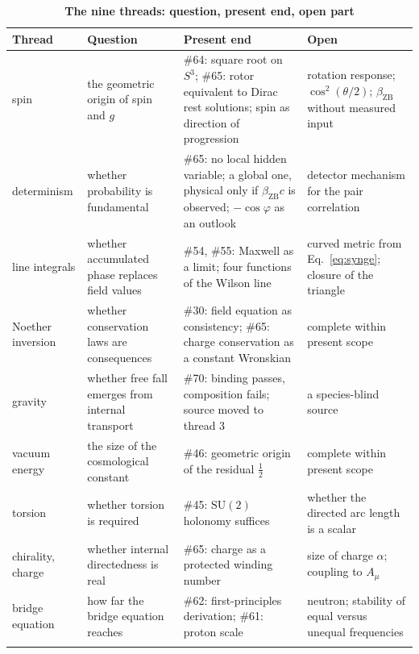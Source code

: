 \documentclass[%
 reprint, amsmath,amssymb, aps, prb, ]{revtex4-2}
\numberwithin{equation}{section}
\newcommand{\betaZB}{\beta_{\text{ZB}}}
\begin{document}
\begin{table}[t!]
\centering
\caption{\textbf{The nine threads: question, present end, open part}}
\label{tab:threads}
\renewcommand{\arraystretch}{1.35}
\setlength{\tabcolsep}{6pt}
\begin{tabular}{>{\raggedright\arraybackslash}p{2.4cm}>{\raggedright\arraybackslash}p{4.0cm}>{\raggedright\arraybackslash}p{5.0cm}>{\raggedright\arraybackslash}p{4.8cm}}
\toprule
\textbf{Thread} & \textbf{Question} & \textbf{Present end} & \textbf{Open} \\
\midrule
1 spin & the geometric origin of spin and $g$ & \#64: square root on $S^{3}$; \#65: rotor equivalent to Dirac rest solutions; spin as direction of progression & rotation response; $\cos^{2}(\theta/2)$; $\betaZB$ without measured input \\
\addlinespace[0.1cm]
2 determinism & whether probability is fundamental & \#65: no local hidden variable; a global one, physical only if $\betaZB c$ is observed; $-\cos\varphi$ as an outlook & detector mechanism for the pair correlation \\
\addlinespace[0.1cm]
3 line integrals & whether accumulated phase replaces field values & \#54, \#55: Maxwell as a limit; four functions of the Wilson line & curved metric from Eq.~\eqref{eq:synge}; closure of the triangle \\
\addlinespace[0.1cm]
4 Noether inversion & whether conservation laws are consequences & \#30: field equation as consistency; \#65: charge conservation as a constant Wronskian & complete within present scope \\
\addlinespace[0.1cm]
5 gravity & whether free fall emerges from internal transport & \#70: binding passes, composition fails; source moved to thread 3 & a species-blind source \\
\addlinespace[0.1cm]
6 vacuum energy & the size of the cosmological constant & \#46: geometric origin of the residual $\tfrac12$ & complete within present scope \\
\addlinespace[0.1cm]
7 torsion & whether torsion is required & \#45: $\mathrm{SU}(2)$ holonomy suffices & whether the directed arc length is a scalar \\
\addlinespace[0.1cm]
8 chirality, charge & whether internal directedness is real & \#65: charge as a protected winding number & size of charge $\alpha$; coupling to $A_\mu$ \\
\addlinespace[0.1cm]
9 bridge equation & how far the bridge equation reaches & \#62: first-principles derivation; \#61: proton scale & neutron; stability of equal versus unequal frequencies \\
\addlinespace[0.1cm]
\bottomrule
\end{tabular}
\end{table}
\end{document}
